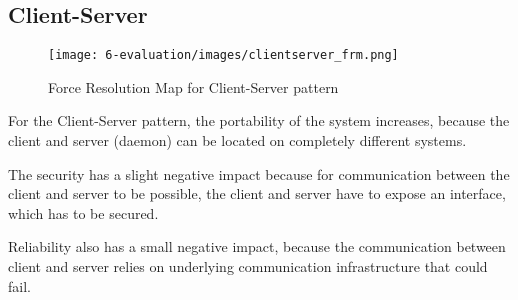 \subsection{Client-Server}
\begin{figure}[H]
\centering
\texttt{[image: 6-evaluation/images/clientserver\_frm.png]}
\caption{Force Resolution Map for Client-Server pattern}
\label{fig:clientserver-frm}
\end{figure}
For the Client-Server pattern, the portability of the system increases, because the client and server (daemon) can be located on completely different systems.

The security has a slight negative impact because for communication between the client and server to be possible, the client and server have to expose an interface, which has to be secured. 

Reliability also has a small negative impact, because the communication between client and server relies on underlying communication infrastructure that could fail. 


